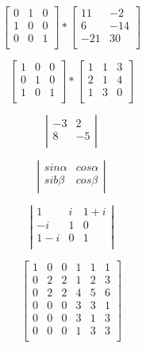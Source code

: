 \documentclass[12pt, letterpaper, titlepage]{article}
\begin{document}
$$
\left[ \begin{array}{ccc}
0 & 1 & 0 \\
1 & 0 & 0 \\
0 & 0 & 1 \\
\end{array} \right] 
*
\left[ \begin{array}{cc}
11 & -2 \\
6 & -14 \\
-21 & 30 \\
\end{array} \right]
$$

$$
\left[ \begin{array}{ccc}
1 & 0 & 0 \\
0 & 1 & 0 \\
1 & 0 & 1 \\
\end{array} \right] 
*
\left[ \begin{array}{ccc}
1 & 1 & 3 \\
2 & 1 & 4 \\
1 & 3 & 0 \\
\end{array} \right]
$$

$$
\left| \begin{array}{cc}
-3 & 2 \\
8 & -5 \\
\end{array} \right|
$$

$$
\left| \begin{array}{cc}
sin\alpha & cos\alpha \\
sib\beta & cos\beta \\
\end{array} \right|
$$

$$
\left| \begin{array}{ccc}
1 & i & 1+i \\
-i & 1 & 0 \\
1-i & 0 & 1 \\
\end{array} \right|
$$

$$
\left[ \begin{array}{c|cc|ccc}
1 & 0 & 0 & 1 & 1 & 1 \\
\hline
0 & 2 & 2 & 1 & 2 & 3 \\
0 & 2 & 2 & 4 & 5 & 6 \\
\hline
0 & 0 & 0 & 3 & 3 & 1 \\
0 & 0 & 0 & 3 & 1 & 3 \\
0 & 0 & 0 & 1 & 3 & 3 \\
\end{array} \right]
$$
\end{document}
